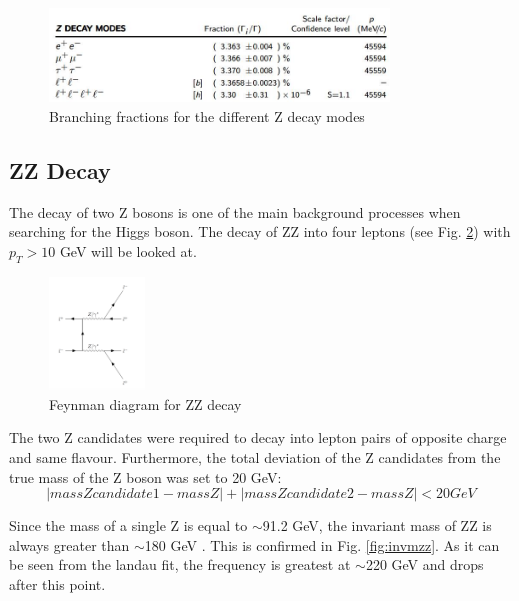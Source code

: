 \documentclass[runningheads,a4paper]{llncs}
\begin{document}
\begin{figure}
\centering
\includegraphics[height=2.5cm]{zdecaymodes}
\caption{Branching fractions for the different Z decay modes}
\label{fig:zdecaymodes}
\end{figure}


\subsection{ZZ Decay}

The decay of two Z bosons is one of the main background processes when searching for the Higgs boson. The decay of ZZ into four leptons (see Fig. \ref{fig:feynmzz}) with ${p}_{T} > 10$ GeV will be looked at.\\

\begin{figure}[H]
\centering
\includegraphics[height=3cm]{feynm_ZZ}
\caption{Feynman diagram for ZZ decay}
\label{fig:feynmzz}
\end{figure}

The two Z candidates were required to decay into lepton pairs of opposite charge and same flavour. Furthermore, the total deviation of the Z candidates from the true mass of the Z boson was set to 20 GeV:\\

\begin{equation}
|mass Z candidate 1 - mass Z| + |mass Z candidate 2 - mass Z| < 20 GeV
\end{equation}

Since the mass of a single Z is equal to $\sim$91.2 GeV, the invariant mass of ZZ is always greater than $\sim$180 GeV \cite{Agashe:2014kda}. This is confirmed in Fig. \ref{fig:invmzz}. As it can be seen from the landau fit, the frequency is greatest at $\sim$220 GeV and drops after this point.\\
\end{document}
